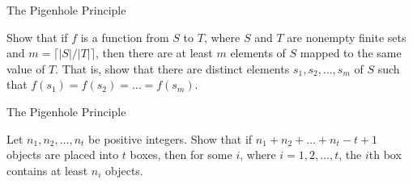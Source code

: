 \documentclass{beamer}
\begin{document}
\begin{frame}[t]{The Pigenhole Principle}
    \begin{example}
        Show that if $f$ is a function from $S$ to $T$, where $S$ and $T$ are nonempty finite sets and $m = \lceil |S|/|T| \rceil$, then there are at least $m$ elements of $S$ mapped to the same value of $T$. That is, show that there are distinct elements $s_1,s_2,\dots,s_m$ of $S$ such that $f(s_1) = f(s_2) = \dots = f(s_m)$.
    \end{example}
\end{frame}

\begin{frame}[t]{The Pigenhole Principle}
    \begin{example}
        Let $n_1, n_2,\dots, n_t$ be positive integers. Show that if $n_1 + n_2 +\dots+ n_t - t + 1$ objects are placed into $t$ boxes, then for some $i$, where $i = 1, 2,\dots, t$, the $i$th box contains at least $n_i$ objects.
    \end{example}
\end{frame}
\end{document}
